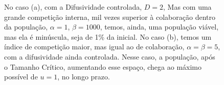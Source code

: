 \documentclass{article}
\begin{document}
 	\begin{figure}[h]
 		\centering
 		\qquad
 		\caption{No caso (a), com a Difusividade controlada, $D=2$, Mas com uma grande competição interna, mil vezes superior à colaboração dentro da população, $\alpha=1$, $\beta=1000$, temos, ainda, uma população viável, mas ela é minúscula, seja de 1\% da inicial. No caso (b), temos um índice de competição maior, mas igual ao de colaboração, $\alpha = \beta = 5$, com a difusividade ainda controlada. Nesse caso, a população, após o Tamanho Crítico, aumentando esse espaço, chega ao máximo possível de $u = 1$, no longo prazo.}
 		\label{fig:TamanhoMax-alpha1-beta1000-D2}
 	\end{figure}
\end{document}
